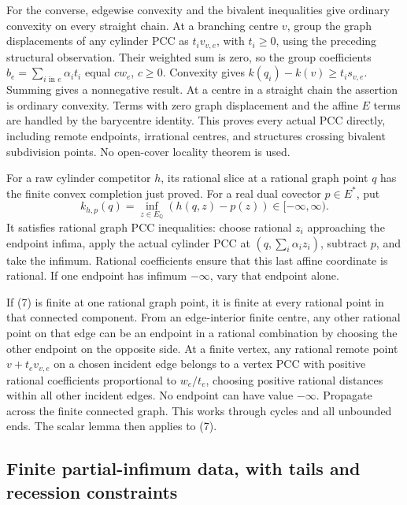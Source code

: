 \documentclass[
  11pt,
]{article}
\begin{document}
For the converse, edgewise convexity and the bivalent inequalities give
ordinary convexity on every straight chain. At a branching centre \(v\),
group the graph displacements of any cylinder PCC as \(t_i v_{v,e}\),
with \(t_i\geq0\), using the preceding structural observation. Their
weighted sum is zero, so the group coefficients
\(b_e=\sum_{i\text{ in }e}\alpha_it_i\) equal \(cw_e\), \(c\geq0\).
Convexity gives \(k(q_i)-k(v)\geq t_i s_{v,e}\). Summing gives a
nonnegative result. At a centre in a straight chain the assertion is
ordinary convexity. Terms with zero graph displacement and the affine
\(E\) terms are handled by the barycentre identity. This proves every
actual PCC directly, including remote endpoints, irrational centres, and
structures crossing bivalent subdivision points. No open-cover locality
theorem is used.

For a raw cylinder competitor \(h\), its rational slice at a rational
graph point \(q\) has the finite convex completion just proved. For a
real dual covector \(p\in E^*\), put \[
 k_{h,p}(q)=\inf_{z\in E_{\mathbb{Q}}}(h(q,z)-p(z))\in[-\infty,\infty).             \tag{7}
\] It satisfies rational graph PCC inequalities: choose rational \(z_i\)
approaching the endpoint infima, apply the actual cylinder PCC at
\((q,\sum_i\alpha_i z_i)\), subtract \(p\), and take the infimum.
Rational coefficients ensure that this last affine coordinate is
rational. If one endpoint has infimum \(-\infty\), vary that endpoint
alone.

If (7) is finite at one rational graph point, it is finite at every
rational point in that connected component. From an edge-interior finite
centre, any other rational point on that edge can be an endpoint in a
rational combination by choosing the other endpoint on the opposite
side. At a finite vertex, any rational remote point \(v+t_ev_{v,e}\) on
a chosen incident edge belongs to a vertex PCC with positive rational
coefficients proportional to \(w_e/t_e\), choosing positive rational
distances within all other incident edges. No endpoint can have value
\(-\infty\). Propagate across the finite connected graph. This works
through cycles and all unbounded ends. The scalar lemma then applies to
(7).

\subsection{Finite partial-infimum data, with tails and recession
constraints}\label{finite-partial-infimum-data-with-tails-and-recession-constraints}
\end{document}
